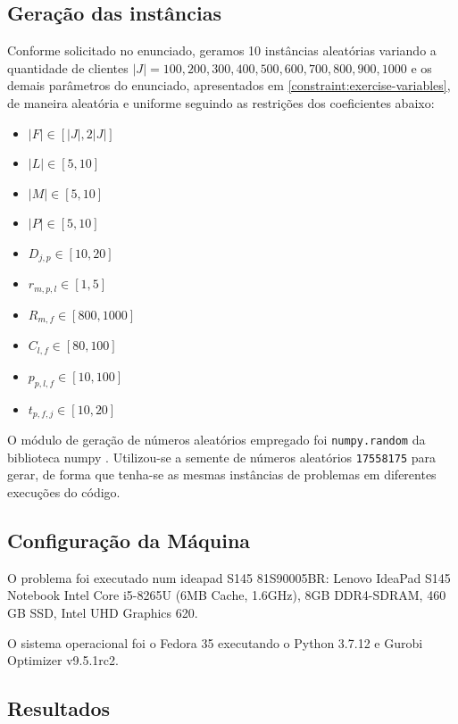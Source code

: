 \documentclass{article}
\begin{document}
\subsection{Geração das instâncias}

Conforme solicitado no enunciado, geramos 10 instâncias aleatórias variando a quantidade de clientes $|J| = {100, 200, 300, 400, 500, 600, 700, 800, 900, 1000}$ e os demais parâmetros do enunciado, apresentados em \ref{constraint:exercise-variables}, de maneira aleatória e uniforme seguindo as restrições dos coeficientes abaixo:

\begin{itemize}
	\item $|F| \in [|J|,2|J|]$
	\item $|L| \in [5,10]$
	\item $|M| \in [5,10]$
	\item $|P| \in [5,10]$
	\item $D_{j,p} \in [10,20]$
	\item $r_{m,p,l} \in [1,5]$
	\item $R_{m, f} \in [800,1000]$
	\item $C_{l,f} \in [80,100]$
	\item $p_{p,l,f} \in [10,100]$
	\item $t_{p,f,j} \in [10,20]$
\end{itemize}

O módulo de geração de números aleatórios empregado foi \verb|numpy.random| da biblioteca numpy \cite{bib:numpy}. Utilizou-se a semente de números aleatórios \verb|17558175| para gerar, de forma que tenha-se as mesmas instâncias de problemas em diferentes execuções do código.

\subsection{Configuração da Máquina}

O problema foi executado num ideapad S145 81S90005BR: Lenovo IdeaPad S145 Notebook Intel Core i5-8265U (6MB Cache, 1.6GHz), 8GB DDR4-SDRAM, 460 GB SSD, Intel UHD Graphics 620.

O sistema operacional foi o Fedora 35 executando o Python 3.7.12 e Gurobi Optimizer v9.5.1rc2.

\subsection{Resultados}
\end{document}
